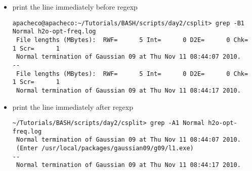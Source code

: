 \documentclass[10pt,t]{beamer}
\begin{document}
\begin{frame}
\begin{itemize}
    \item print the line immediately before regexp
      \begin{lstlisting}[style=LINUX]
apacheco@apacheco:~/Tutorials/BASH/scripts/day2/csplit> grep -B1 Normal h2o-opt-freq.log
 File lengths (MBytes):  RWF=      5 Int=      0 D2E=      0 Chk=      1 Scr=      1
 Normal termination of Gaussian 09 at Thu Nov 11 08:44:07 2010.
--
 File lengths (MBytes):  RWF=      5 Int=      0 D2E=      0 Chk=      1 Scr=      1
 Normal termination of Gaussian 09 at Thu Nov 11 08:44:17 2010.
      \end{lstlisting}
      \framebreak
    \item print the line immediately after regexp
      \begin{lstlisting}[style=LINUX]
~/Tutorials/BASH/scripts/day2/csplit> grep -A1 Normal h2o-opt-freq.log
 Normal termination of Gaussian 09 at Thu Nov 11 08:44:07 2010.
 (Enter /usr/local/packages/gaussian09/g09/l1.exe)
--
 Normal termination of Gaussian 09 at Thu Nov 11 08:44:17 2010.
      \end{lstlisting}
  \end{itemize}
\end{frame}
\end{document}
